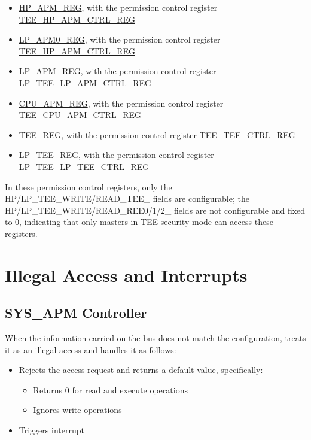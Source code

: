 \documentclass[main\_\_EN.tex]{subfiles}
\begin{document}
\begin{itemize}
    \item \hyperref[sec:permctrl-reg-hp]{HP\_APM\_REG}, with the permission control register \hyperref[regdesc:TEEHPAPMCTRLREG]{TEE\_HP\_APM\_CTRL\_REG}

    \item \hyperref[sec:permctrl-reg-lp0]{LP\_APM0\_REG}, with the permission control register \hyperref[regdesc:TEEHPAPMCTRLREG]{TEE\_HP\_APM\_CTRL\_REG}

    \item \hyperref[sec:permctrl-reg-lp]{LP\_APM\_REG}, with the permission control register \hyperref[regdesc:LPTEELPAPMCTRLREG]{LP\_TEE\_LP\_APM\_CTRL\_REG}

    \item \hyperref[sec:permctrl-reg-cpu]{CPU\_APM\_REG}, with the permission control register \hyperref[regdesc:TEECPUAPMCTRLREG]{TEE\_CPU\_APM\_CTRL\_REG}

    \item \hyperref[sec:permctrl-reg-hp-tee]{TEE\_REG}, with the permission control register \hyperref[regdesc:TEETEECTRLREG]{TEE\_TEE\_CTRL\_REG}

    \item \hyperref[sec:permctrl-reg-lp-tee]{LP\_TEE\_REG}, with the permission control register \hyperref[regdesc:LPTEELPTEECTRLREG]{LP\_TEE\_LP\_TEE\_CTRL\_REG}
\end{itemize}

In these permission control registers, only the HP/LP\_TEE\_{WRITE/READ}\_TEE\_ fields are configurable; the HP/LP\_TEE\_{WRITE/READ}\_REE{0/1/2}\_ fields are not configurable and fixed to 0, indicating that only masters in TEE security mode can access these registers.

\section{Illegal Access and Interrupts}

\subsection{SYS\_APM Controller}

When the information carried on the bus does not match the configuration, \chipname{} treats it as an illegal access and handles it as follows:

\begin{itemize}
    \item Rejects the access request and returns a default value, specifically:
    \begin{itemize}
        \item Returns 0 for read and execute operations
        \item Ignores write operations
    \end{itemize}
    \item Triggers interrupt
\end{itemize}
\end{document}
